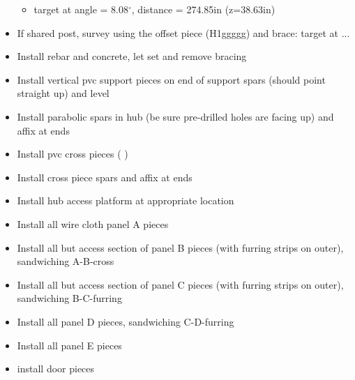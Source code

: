 \documentclass[11pt]{article}
\begin{document}
\begin{itemize}
\begin{itemize}
	\item target at angle = 8.08$^\circ$, distance = 274.85in (z=38.63in)
	\end{itemize}
\item If shared post, survey using the offset piece (H1ggggg) and brace:  target at ...
\item Install rebar and concrete,  let set and remove bracing
\item Install vertical pvc support pieces on end of support spars (should point straight up) and level 
\item Install parabolic spars in hub (be sure pre-drilled holes are facing up) and affix at ends
\item Install pvc cross pieces ( )
\item Install cross piece spars and affix at ends
\item Install hub access platform at appropriate location
\item Install all wire cloth panel A pieces
\item Install all but access section of panel B pieces (with furring strips on outer), sandwiching A-B-cross
\item Install all but access section of panel C pieces (with furring strips on outer), sandwiching B-C-furring
\item Install all panel D pieces, sandwiching C-D-furring
\item Install all panel E pieces
\item install door pieces
\end{itemize}



\end{document}
